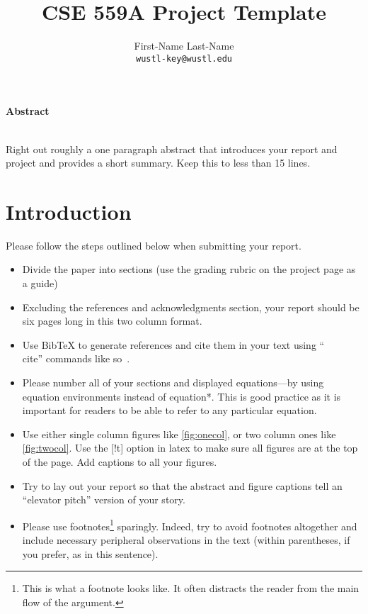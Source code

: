 \documentclass[10pt,twocolumn,letterpaper]{article}
\date{}
\title{CSE 559A Project Template}
\author{%
First-Name Last-Name\\
{\tt wustl-key@wustl.edu}
}
\begin{document}
\maketitle

\begin{center}\textbf{Abstract}\\~\\\parbox{0.475\textwidth}{\em
    
    Right out roughly a one paragraph abstract that introduces your
    report and project and provides a short summary. Keep this to less
    than 15 lines.

}\end{center}

\section{Introduction}

Please follow the steps outlined below when submitting your report.

\begin{itemize}
\item Divide the paper into sections (use the grading rubric on the
  project page as a guide)
  
\item Excluding the references and acknowledgments section, your
  report should be six pages long in this two column format.

\item Use BibTeX to generate references and cite them in your text
  using ``\\cite'' commands like so~\cite{szeliski2010computer}.

\item Please number all of your sections and displayed equations---by
  using equation environments instead of equation*.  This is good
  practice as it is important for readers to be able to refer to any
  particular equation.

\item Use either single column figures like \ref{fig:onecol}, or two
  column ones like \ref{fig:twocol}. Use the [!t] option in latex to
  make sure all figures are at the top of the page. Add captions to
  all your figures.

\item Try to lay out your report so that the abstract and figure
  captions tell an ``elevator pitch'' version of your story.

\item Please use footnotes\footnote {This is what a footnote looks
    like.  It often distracts the reader from the main flow of the
    argument.} sparingly.  Indeed, try to avoid footnotes altogether
  and include necessary peripheral observations in the text (within
  parentheses, if you prefer, as in this sentence).
\end{itemize}
\end{document}
